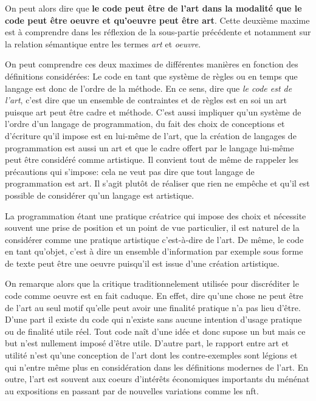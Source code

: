 \documentclass[12pt]{article} %
\begin{document}
On peut alors dire que \textbf{le code peut être de l'art dans la modalité que le code peut être oeuvre et qu'oeuvre peut être art}. Cette deuxième maxime est à comprendre dans les réflexion de la sous-partie précédente et notamment sur la relation sémantique entre les termes \textit{art} et \textit{oeuvre}.

On peut comprendre ces deux maximes de différentes manières en fonction des définitions considérées: Le code en tant que système de règles ou en temps que langage est donc de l'ordre de la méthode. En ce sens, dire que \textit{le code est de l'art}, c'est dire que un ensemble de contraintes et de règles est en soi un art puisque art peut être cadre et méthode. C'est aussi impliquer qu'un système de l'ordre d'un langage de programmation, du fait des choix de conceptions et d'écriture qu'il impose est en lui-même de l'art, que la création de langages de programmation est aussi un art et que le cadre offert par le langage lui-même peut être considéré comme artistique. Il convient tout de même de rappeler les précautions qui s'impose: cela ne veut pas dire que tout langage de programmation est art. Il s'agit plutôt de réaliser que rien ne empêche et qu'il est possible de considérer qu'un langage est artistique.

La programmation étant une pratique créatrice qui impose des choix et nécessite souvent une prise de position et un point de vue particulier, il est naturel de la considérer comme une pratique artistique c'est-à-dire de l'art. De même, le code en tant qu'objet, c'est à dire un ensemble d'information par exemple sous forme de texte peut être une oeuvre puisqu'il est issue d'une création artistique.

On remarque alors que la critique traditionnelement utilisée pour discréditer le code comme oeuvre est en fait caduque. En effet, dire qu'une chose ne peut être de l'art au seul motif qu'elle peut avoir une finalité pratique n'a pas lieu d'être. D'une part il existe du code qui n'existe sans aucune intention d'usage pratique ou de finalité utile réel. Tout code naît d'une idée et donc supose un but mais ce but n'est nullement imposé d'être utile. D'autre part, le rapport entre art et utilité n'est qu'une conception de l'art dont les contre-exemples sont légions et qui n'entre même plus en considération dans les définitions modernes de l'art. En outre, l'art est souvent aux coeurs d'intérêts économiques importants du ménénat au expositions en passant par de nouvelles variations comme les \acrshort{nft}.
\end{document}

